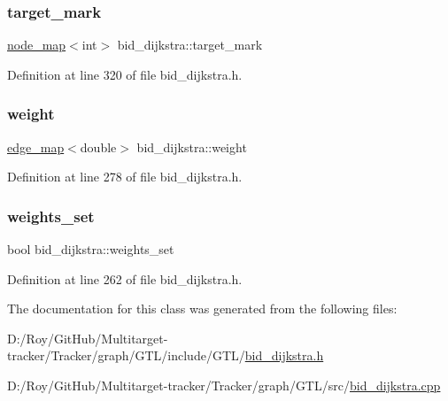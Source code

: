 \mbox{\label{classbid__dijkstra_a72bc13758ebe2f752cd15f018c5ba64e}} 
\subsubsection{\texorpdfstring{target\+\_\+mark}{target\_mark}}
{\footnotesize\ttfamily \mbox{\hyperlink{classnode__map}{node\+\_\+map}}$<$int$>$ bid\+\_\+dijkstra\+::target\+\_\+mark\hspace{0.3cm}{\ttfamily [private]}}



Definition at line 320 of file bid\+\_\+dijkstra.\+h.

\mbox{\label{classbid__dijkstra_a477c4f7ce631df84c832cb7d517cd243}} 
\subsubsection{\texorpdfstring{weight}{weight}}
{\footnotesize\ttfamily \mbox{\hyperlink{classedge__map}{edge\+\_\+map}}$<$double$>$ bid\+\_\+dijkstra\+::weight\hspace{0.3cm}{\ttfamily [private]}}



Definition at line 278 of file bid\+\_\+dijkstra.\+h.

\mbox{\label{classbid__dijkstra_a7636f90a27d14c9eb4b115e8dad05464}} 
\subsubsection{\texorpdfstring{weights\+\_\+set}{weights\_set}}
{\footnotesize\ttfamily bool bid\+\_\+dijkstra\+::weights\+\_\+set\hspace{0.3cm}{\ttfamily [private]}}



Definition at line 262 of file bid\+\_\+dijkstra.\+h.



The documentation for this class was generated from the following files\+:\begin{DoxyCompactItemize}
\item 
D\+:/\+Roy/\+Git\+Hub/\+Multitarget-\/tracker/\+Tracker/graph/\+G\+T\+L/include/\+G\+T\+L/\mbox{\hyperlink{bid__dijkstra_8h}{bid\+\_\+dijkstra.\+h}}\item 
D\+:/\+Roy/\+Git\+Hub/\+Multitarget-\/tracker/\+Tracker/graph/\+G\+T\+L/src/\mbox{\hyperlink{bid__dijkstra_8cpp}{bid\+\_\+dijkstra.\+cpp}}\end{DoxyCompactItemize}
